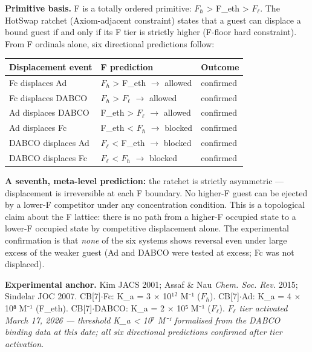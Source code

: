 \documentclass[12pt,a4paper]{article}
\begin{document}
\textbf{Primitive basis.} F is a totally ordered primitive: $F_{\hbar}$ \textgreater{} F\_eth \textgreater{} $F_{\ell}$. The HotSwap ratchet (Axiom-adjacent constraint) states that a guest can displace a bound guest if and only if its F tier is strictly higher (F-floor hard constraint). From F ordinals alone, six directional predictions follow:

\begin{table}[htbp]
\centering
\small
{}
\begin{tabularx}{\textwidth}{>{\centering\arraybackslash}X >{\centering\arraybackslash}X >{\centering\arraybackslash}X}
\toprule
\rowcolor{gray!25}\textbf{Displacement event} & \textbf{F prediction} & \textbf{Outcome} \\
\midrule
\rowcolors{1}{white}{gray!10}
Fc displaces Ad & $F_{\hbar}$ \textgreater{} F\_eth $\rightarrow$ allowed &  confirmed \\
Fc displaces DABCO & $F_{\hbar}$ \textgreater{} $F_{\ell}$ $\rightarrow$ allowed &  confirmed \\
Ad displaces DABCO & F\_eth \textgreater{} $F_{\ell}$ $\rightarrow$ allowed &  confirmed \\
Ad displaces Fc & F\_eth \textless{} $F_{\hbar}$ $\rightarrow$ blocked &  confirmed \\
DABCO displaces Ad & $F_{\ell}$ \textless{} F\_eth $\rightarrow$ blocked &  confirmed \\
DABCO displaces Fc & $F_{\ell}$ \textless{} $F_{\hbar}$ $\rightarrow$ blocked &  confirmed \\
\bottomrule
\end{tabularx}
\end{table}

\textbf{A seventh, meta-level prediction:} the ratchet is strictly asymmetric --- displacement is irreversible at each F boundary. No higher-F guest can be ejected by a lower-F competitor under any concentration condition. This is a topological claim about the F lattice: there is no path from a higher-F occupied state to a lower-F occupied state by competitive displacement alone. The experimental confirmation is that \emph{none} of the six systems shows reversal even under large excess of the weaker guest (Ad and DABCO were tested at excess; Fc was not displaced).

\textbf{Experimental anchor.} Kim JACS 2001; Assaf \& Nau \emph{Chem. Soc. Rev.} 2015; Sindelar JOC 2007.
CB{[}7{]}$\cdot$Fc: K\_a = 3 $\times$ 10¹$^{2}$ M⁻¹ ($F_{\hbar}$). CB{[}7{]}$\cdot$Ad: K\_a = 4 $\times$ 10⁸ M⁻¹ (F\_eth). CB{[}7{]}$\cdot$DABCO: K\_a = 2 $\times$ 10⁵ M⁻¹ ($F_{\ell}$). \emph{$F_{\ell}$ tier activated March 17, 2026 --- threshold K\_a \textless{} 10⁷ M⁻¹ formalised from the DABCO binding data at this date; all six directional predictions confirmed after tier activation.}
\end{document}
